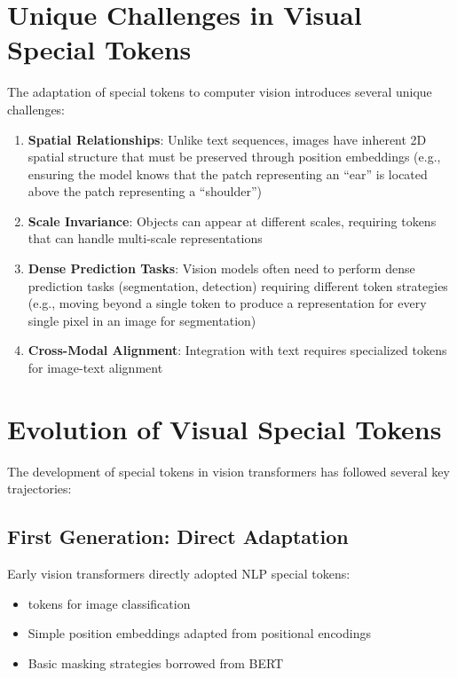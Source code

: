\section{Unique Challenges in Visual Special Tokens}

The adaptation of special tokens to computer vision introduces several unique challenges:

\begin{enumerate}
\item \textbf{Spatial Relationships}: Unlike text sequences, images have inherent 2D spatial structure that must be preserved through position embeddings (e.g., ensuring the model knows that the patch representing an ``ear'' is located above the patch representing a ``shoulder'')
\item \textbf{Scale Invariance}: Objects can appear at different scales, requiring tokens that can handle multi-scale representations
\item \textbf{Dense Prediction Tasks}: Vision models often need to perform dense prediction tasks (segmentation, detection) requiring different token strategies (e.g., moving beyond a single \cls{} token to produce a representation for every single pixel in an image for segmentation)
\item \textbf{Cross-Modal Alignment}: Integration with text requires specialized tokens for image-text alignment
\end{enumerate}

\begin{comment}
Feedback: Add references to the generations and different challenges. Add to the top level bib file and ref here.
\end{comment}

\section{Evolution of Visual Special Tokens}

The development of special tokens in vision transformers has followed several key trajectories:

\subsection{First Generation: Direct Adaptation}
Early vision transformers directly adopted NLP special tokens:
\begin{itemize}
\item \cls{} tokens for image classification
\item Simple position embeddings adapted from positional encodings
\item Basic masking strategies borrowed from BERT
\end{itemize}

